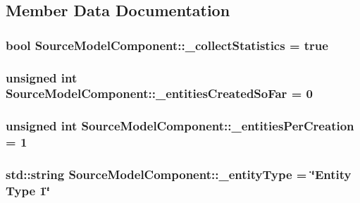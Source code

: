 \subsection{Member Data Documentation}
\hypertarget{class_source_model_component_ac0c009ff9a2e8169d251118dabcd19eb}{
\subsubsection[{\-\_\-collect\-Statistics}]{\setlength{\rightskip}{0pt plus 5cm}bool Source\-Model\-Component\-::\-\_\-collect\-Statistics = true\hspace{0.3cm}{\ttfamily [protected]}}}\label{class_source_model_component_ac0c009ff9a2e8169d251118dabcd19eb}
\hypertarget{class_source_model_component_af1f4fb38d2c0c4ac08235d7aec131bc9}{
\subsubsection[{\-\_\-entities\-Created\-So\-Far}]{\setlength{\rightskip}{0pt plus 5cm}unsigned int Source\-Model\-Component\-::\-\_\-entities\-Created\-So\-Far = 0\hspace{0.3cm}{\ttfamily [protected]}}}\label{class_source_model_component_af1f4fb38d2c0c4ac08235d7aec131bc9}
\hypertarget{class_source_model_component_a68b0576903281a4716eb3ea0281dd133}{
\subsubsection[{\-\_\-entities\-Per\-Creation}]{\setlength{\rightskip}{0pt plus 5cm}unsigned int Source\-Model\-Component\-::\-\_\-entities\-Per\-Creation = 1\hspace{0.3cm}{\ttfamily [protected]}}}\label{class_source_model_component_a68b0576903281a4716eb3ea0281dd133}
\hypertarget{class_source_model_component_ad001e8ae30c828916f271ac72c7817d1}{
\subsubsection[{\-\_\-entity\-Type}]{\setlength{\rightskip}{0pt plus 5cm}std\-::string Source\-Model\-Component\-::\-\_\-entity\-Type = \char`\"{}Entity Type 1\char`\"{}\hspace{0.3cm}{\ttfamily [protected]}}}\label{class_source_model_component_ad001e8ae30c828916f271ac72c7817d1}
